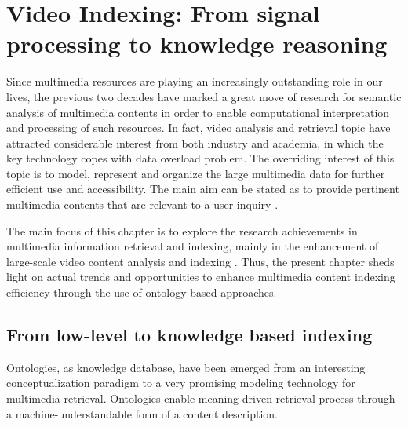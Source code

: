 \chapter{Video Indexing: From signal processing to knowledge reasoning}
\label{state2}

Since multimedia resources are playing an increasingly outstanding role in our lives, the previous two decades have marked a great move 
of research for semantic analysis of multimedia contents in order to enable computational interpretation and processing of 
such resources. In fact, video analysis and retrieval topic have attracted considerable interest from both industry and academia, 
in which the key technology copes with data overload problem. The overriding interest of this topic is to model, represent and 
organize the large multimedia data for further efficient use and accessibility. The main aim can be stated as to provide 
pertinent multimedia contents that are relevant to a user inquiry \citep{Jaimes2005,Lew2006,Feng2013}.

The main focus of this chapter is to explore the research achievements in multimedia information retrieval and 
indexing, mainly in the enhancement of large-scale video content analysis and indexing 
\citep{Dasiopoulou2005, Snoek2008, Gani2015}. Thus, the present chapter sheds light on actual trends 
and opportunities to enhance multimedia content indexing efficiency through the use of ontology based approaches. 

	
\section{From low-level to knowledge based indexing}

	Ontologies, as knowledge database, have been emerged from an 
	interesting conceptualization paradigm to a very promising modeling technology for multimedia 
	retrieval. Ontologies enable meaning driven retrieval process through a machine-understandable 
	form of a content description.

